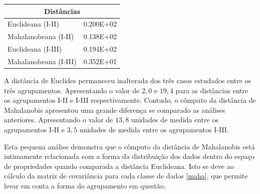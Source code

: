  \begin{table}[H]
 	\centering
 	\label{metrica3}
 	\begin{tabular}{|l|l|}
 		\hline
 		\multicolumn{2}{|c|}{Distâncias}  \\ \hline
 		Euclideana (I-II)     & 0.200E+02 \\ \hline
 		Mahalanobeana (I-II)  & 0.138E+02 \\ \hline
 		Euclideana (I-III)    & 0.194E+02 \\ \hline
 		Mahalanobeana (I-III) & 0.352E+01 \\ \hline
 	\end{tabular}
 \end{table}

A distância de Euclides permaneceu inalterada dos três casos estudados entre os três agrupamentos. Apresentando o valor de $2,0$ e $19,4$ para as distâncias entre os agrupamentos I-II e I-III respectivamente. Contudo, o cômputo da distância de Mahalanobis apresentou uma grande diferença se comparado as análises anteriores. Apresentando o valor de $13,8$ unidades de medida entre os agrupamentos I-II e $3,5$ unidades de medida entre os agrupamentos I-III.  

Esta pequena análise demonstra que o cômputo da distância de Mahalanobis está intimamente relacionada com a forma da distribuição dos dados dentro do espaço de propriedades quando comparada a distância Euclideana. Isto se deve ao cálculo da matriz de covariância para cada classe de dados \ref{maha}, que permite levar em conta a forma do agrupamento em questão. 


